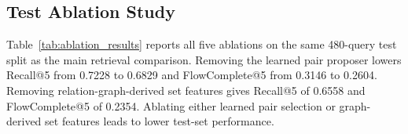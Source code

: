 \subsection{Test Ablation Study}
\label{sec:ablation_results}

Table~\ref{tab:ablation_results} reports all five ablations on the same 480-query test split as the main retrieval comparison. Removing the learned pair proposer lowers Recall@5 from 0.7228 to 0.6829 and FlowComplete@5 from 0.3146 to 0.2604. Removing relation-graph-derived set features gives Recall@5 of 0.6558 and FlowComplete@5 of 0.2354. Ablating either learned pair selection or graph-derived set features leads to lower test-set performance.

